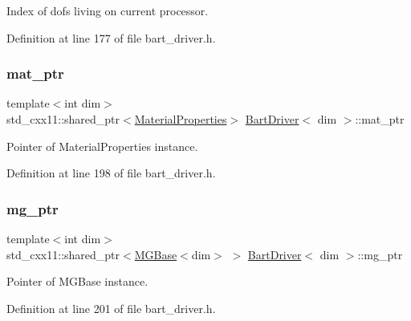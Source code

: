 Index of dofs living on current processor. 



Definition at line 177 of file bart\+\_\+driver.\+h.

\mbox{\label{class_bart_driver_aef9abac579c212463a6790a0e39e6429}} 
\subsubsection{\texorpdfstring{mat\+\_\+ptr}{mat\_ptr}}
{\footnotesize\ttfamily template$<$int dim$>$ \\
std\+\_\+cxx11\+::shared\+\_\+ptr$<$\hyperlink{class_material_properties}{Material\+Properties}$>$ \hyperlink{class_bart_driver}{Bart\+Driver}$<$ dim $>$\+::mat\+\_\+ptr\hspace{0.3cm}{\ttfamily [private]}}



Pointer of Material\+Properties instance. 



Definition at line 198 of file bart\+\_\+driver.\+h.

\mbox{\label{class_bart_driver_a1ae1a91d9a049ba4354c71f6ad689d74}} 
\subsubsection{\texorpdfstring{mg\+\_\+ptr}{mg\_ptr}}
{\footnotesize\ttfamily template$<$int dim$>$ \\
std\+\_\+cxx11\+::shared\+\_\+ptr$<$\hyperlink{class_m_g_base}{M\+G\+Base}$<$dim$>$ $>$ \hyperlink{class_bart_driver}{Bart\+Driver}$<$ dim $>$\+::mg\+\_\+ptr\hspace{0.3cm}{\ttfamily [private]}}



Pointer of M\+G\+Base instance. 



Definition at line 201 of file bart\+\_\+driver.\+h.

\mbox{\label{class_bart_driver_a976c3ba1c98180dced85019dfd56e225}} 
